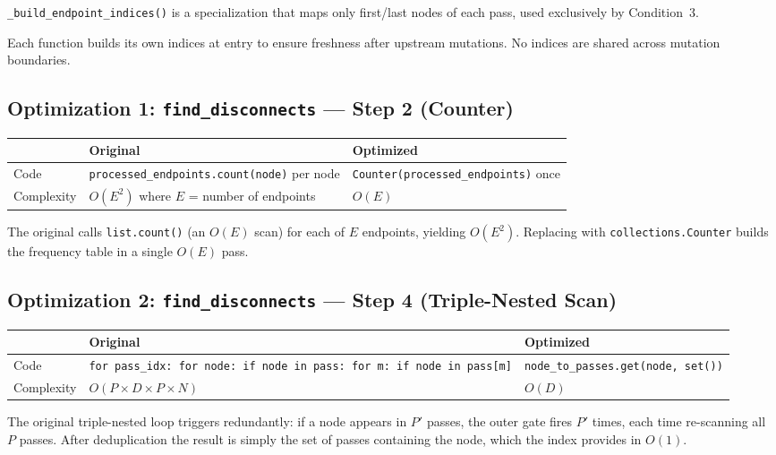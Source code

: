 \documentclass[11pt,a4paper]{article}
\begin{document}
\texttt{\_build\_endpoint\_indices()} is a specialization that maps only first/last nodes of each pass, used exclusively by Condition~3.

Each function builds its own indices at entry to ensure freshness after upstream mutations. No indices are shared across mutation boundaries.

\subsection{Optimization 1: \texttt{find\_disconnects} --- Step 2 (Counter)}

\begin{table}[H]
\centering
\begin{tabularx}{\textwidth}{lXX}
\toprule
& \textbf{Original} & \textbf{Optimized} \\
\midrule
Code & \texttt{processed\_endpoints.count(node)} per node & \texttt{Counter(processed\_endpoints)} once \\
Complexity & $O(E^2)$ where $E$ = number of endpoints & $O(E)$ \\
\bottomrule
\end{tabularx}
\end{table}

The original calls \texttt{list.count()} (an $O(E)$ scan) for each of $E$ endpoints, yielding $O(E^2)$. Replacing with \texttt{collections.Counter} builds the frequency table in a single $O(E)$ pass.

\subsection{Optimization 2: \texttt{find\_disconnects} --- Step 4 (Triple-Nested Scan)}

\begin{table}[H]
\centering
\begin{tabularx}{\textwidth}{lXX}
\toprule
& \textbf{Original} & \textbf{Optimized} \\
\midrule
Code & \texttt{for pass\_idx: for node: if node in pass: for m: if node in pass[m]} & \texttt{node\_to\_passes.get(node, set())} \\
Complexity & $O(P \times D \times P \times N)$ & $O(D)$ \\
\bottomrule
\end{tabularx}
\end{table}

The original triple-nested loop triggers redundantly: if a node appears in $P'$ passes, the outer gate fires $P'$ times, each time re-scanning all $P$ passes. After deduplication the result is simply the set of passes containing the node, which the index provides in $O(1)$.
\end{document}
